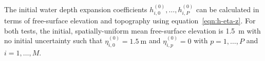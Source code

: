 
The initial water depth expansion coefficients $h_{i,0}^{(0)}, \ldots, h_{i,P}^{(0)}$ can be calculated in terms of free-surface elevation and topography using equation~\eqref{eqn:h-eta-z}.
For both tests, the initial, spatially-uniform mean free-surface elevation is \SI{1.5}{\meter} with no initial uncertainty such that $\eta_{i,0}^{(0)} = \SI{1.5}{\meter}$ and $\eta_{i,p}^{(0)} = 0$ with $p = 1, \ldots, P$ and $i = 1, \ldots, M$.



